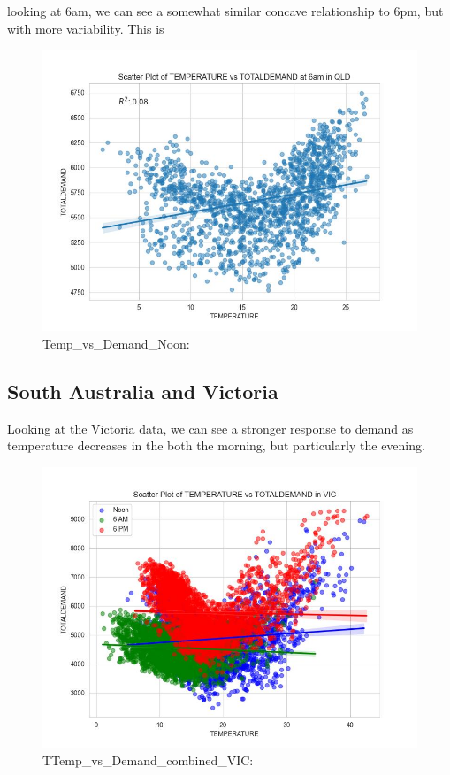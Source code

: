 \documentclass[mstat,12pt]{unswthesis}
\begin{document}
looking at 6am, we can see a somewhat similar concave relationship to
6pm, but with more variability. This is

\begin{figure}
\centering
\includegraphics{img/Temp_vs_Demand_6am.jpg}
\caption{Temp\_vs\_Demand\_Noon:}
\end{figure}

\subsection{South Australia and
Victoria}\label{south-australia-and-victoria}

Looking at the Victoria data, we can see a stronger response to demand
as temperature decreases in the both the morning, but particularly the
evening.

\begin{figure}
\centering
\includegraphics{img/Temp_vs_Demand_combined_VIC.jpg}
\caption{TTemp\_vs\_Demand\_combined\_VIC:}
\end{figure}
\end{document}
